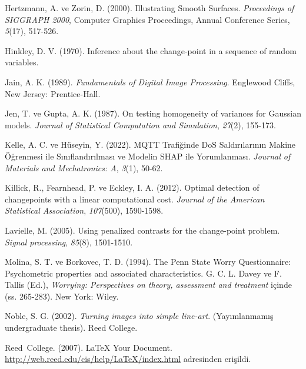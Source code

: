 \documentclass[12pt,twoside]{deuthesis}
\begin{document}
\begin{CSLReferences}{1}{0}
\leavevmode{}%
Hertzmann, A. ve Zorin, D. (2000). Illustrating Smooth Surfaces. \emph{Proceedings of SIGGRAPH 2000}, Computer Graphics Proceedings, Annual Conference Series, \emph{5}(17), 517-526.

\leavevmode{}%
Hinkley, D. V. (1970). Inference about the change-point in a sequence of random variables.

\leavevmode{}%
Jain, A. K. (1989). \emph{Fundamentals of Digital Image Processing}. Englewood Cliffs, New Jersey: Prentice-Hall.

\leavevmode{}%
Jen, T. ve Gupta, A. K. (1987). On testing homogeneity of variances for Gaussian models. \emph{Journal of Statistical Computation and Simulation}, \emph{27}(2), 155-173.

\leavevmode{}%
Kelle, A. C. ve Hüseyin, Y. (2022). MQTT Trafi{ğ}inde DoS Sald{ı}r{ı}lar{ı}n{ı}n Makine {Ö}{ğ}renmesi ile S{ı}n{ı}fland{ı}r{ı}lmas{ı} ve Modelin SHAP ile Yorumlanmas{ı}. \emph{Journal of Materials and Mechatronics: A}, \emph{3}(1), 50-62.

\leavevmode{}%
Killick, R., Fearnhead, P. ve Eckley, I. A. (2012). Optimal detection of changepoints with a linear computational cost. \emph{Journal of the American Statistical Association}, \emph{107}(500), 1590-1598.

\leavevmode{}%
Lavielle, M. (2005). Using penalized contrasts for the change-point problem. \emph{Signal processing}, \emph{85}(8), 1501-1510.

\leavevmode{}%
Molina, S. T. ve Borkovec, T. D. (1994). The {P}enn {S}tate Worry Questionnaire: Psychometric properties and associated characteristics. G. C. L. Davey ve F. Tallis (Ed.), \emph{Worrying: Perspectives on theory, assessment and treatment} içinde (ss. 265-283). New York: Wiley.

\leavevmode{}%
Noble, S. G. (2002). \emph{Turning images into simple line-art}. (Yayımlanmamış undergraduate thesis). Reed College.

\leavevmode{}%
Reed~College. (2007). LaTeX Your Document. \url{http://web.reed.edu/cis/help/LaTeX/index.html} adresinden erişildi.


\end{CSLReferences}
\end{document}
